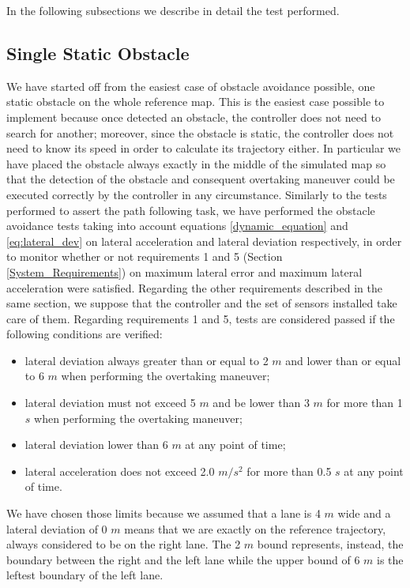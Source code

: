 In the following subsections we describe in detail the test performed.

\subsection{Single Static Obstacle}
We have started off from the easiest case of obstacle avoidance possible, one static obstacle on the whole reference map. This is the easiest case possible to implement because once detected an obstacle, the controller does not need to search for another; moreover, since the obstacle is static, the controller does not need to know its speed in order to calculate its trajectory either.
In particular we have placed the obstacle always exactly in the middle of the simulated map so that the detection of the obstacle and consequent overtaking maneuver could be executed correctly by the controller in any circumstance.
Similarly to the tests performed to assert the path following task, we have performed the obstacle avoidance tests taking into account equations \ref{dynamic_equation} and \ref{eq:lateral_dev} on lateral acceleration and lateral deviation respectively, in order to monitor whether or not requirements 1 and 5 (Section \ref{System_Requirements}) on maximum lateral error and maximum lateral acceleration were satisfied.
Regarding the other requirements described in the same section, we suppose that the controller and the set of sensors installed take care of them.
Regarding requirements 1 and 5, tests are considered passed if the following conditions are verified:
\begin{itemize}
    \item lateral deviation always greater than or equal to 2 $m$ and lower than or equal to 6 $m$ when performing the overtaking maneuver;
    \item  lateral deviation must not exceed 5 $m$ and be lower than 3 $m$ for more than 1 $s$ when performing the overtaking maneuver; 
    \item lateral deviation lower than 6 $m$ at any point of time;
    \item lateral acceleration does not exceed 2.0 $m/s^2$ for more than 0.5 $s$ at any point of time.
\end{itemize}
We have chosen those limits because we assumed that a lane is 4 $m$ wide and a lateral deviation of 0 $m$ means that we are exactly on the reference trajectory, always considered to be on the right lane. The 2 $m$ bound represents, instead, the boundary between the right and the left lane while the upper bound of 6 $m$ is the leftest boundary of the left lane.
